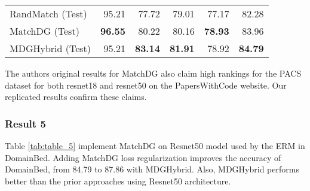 \begin{table}[h]
\begin{tabular}{l|r|r|r|r|r}
RandMatch (Test) & 95.21                  & 77.72                  & 79.01                  & 77.17                  & 82.28                       \\
MatchDG (Test)   & \textbf{96.55}         & 80.22                  & 80.16                  & \textbf{78.93}         & 83.96                       \\
MDGHybrid (Test) & 95.21                  & \textbf{83.14}         & \textbf{81.91}         & 78.92                  & \textbf{84.79}              \\ \hline
\end{tabular}
\end{table}

The authors original results for MatchDG also claim high rankings for the PACS \cite{DBLP:journals/corr/abs-1710-03077, ssdafcvt_PACS} dataset for both resnet18 and resnet50 on the PapersWithCode website. Our replicated results confirm these claims.


\subsubsection{Result 5}

Table \ref{tab:table_5} implement MatchDG on Resnet50 model used by the ERM in DomainBed. Adding MatchDG loss regularization improves the accuracy of DomainBed, from 84.79 to 87.86 with MDGHybrid. Also, MDGHybrid performs better than the prior approaches using Resnet50 architecture.

